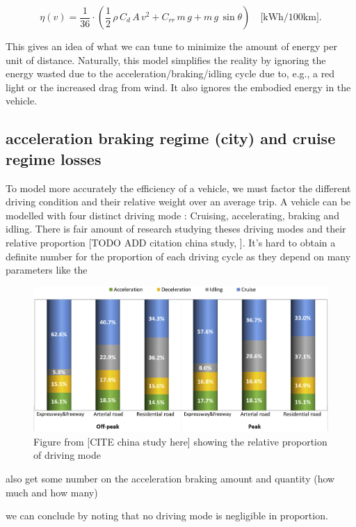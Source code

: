 \begin{equation}
\eta(v) = \frac{1}{36}\cdot\left( \frac{1}{2}\,\rho\,C_d\,A\,v^2 + C_{rr}\,m\,g + m\,g\,\sin\theta \right) \quad \text{[kWh/100km]}.
\label{eq:energy_consumption}
\end{equation}


This gives an idea of what we can tune to minimize the amount of energy per unit of distance. Naturally, this model simplifies the reality by ignoring the energy wasted due to the acceleration/braking/idling cycle due to, e.g., a red light or the increased drag from wind. It also ignores the embodied energy in the vehicle.

\subsection{acceleration braking regime (city) and cruise regime losses}

To model more accurately the efficiency of a vehicle, we must factor the different driving condition and their relative weight over an average trip. A vehicle can be modelled with four distinct driving mode : Cruising, accelerating, braking and idling. There is fair amount of research studying theses driving modes and their relative proportion [TODO ADD citation china study, ]. It's hard to obtain a definite number for the proportion of each driving cycle as they depend on many parameters like the 

\begin{figure}[h]
    \centering
    \includegraphics[width=0.8\linewidth]{Figures/ch2_shareOfDrivingModeChina.jpg}
    \caption{Figure from [CITE china study here] showing the relative proportion of driving mode}
    \label{fig:ch2proportiondrivingmode}
\end{figure}

also get some number on the acceleration braking amount and quantity (how much and how many)

we can conclude by noting that no driving mode is negligible in proportion.

